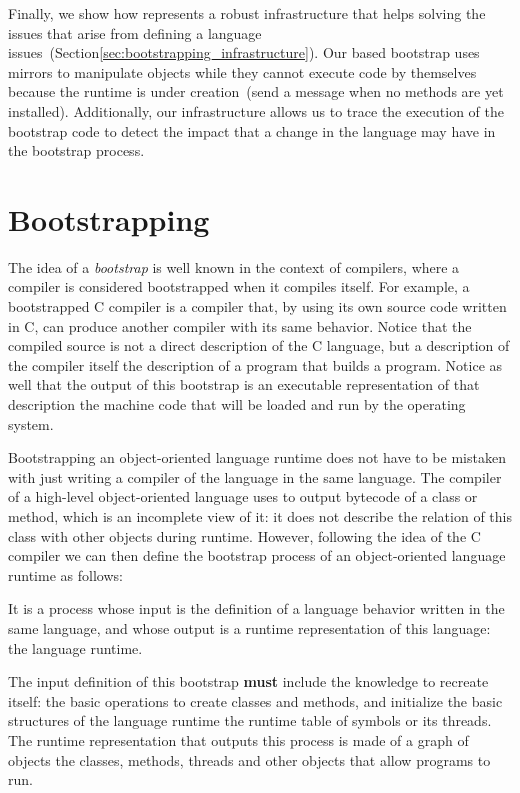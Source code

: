 Finally, we show how \Vtt represents a robust infrastructure that helps solving the issues that arise from defining a language issues~(Section\ref{sec:bootstrapping_infrastructure}). Our \Vtt based bootstrap uses mirrors to manipulate objects while they cannot execute code by themselves because the runtime is under creation~(\eg send a message when no methods are yet installed). Additionally, our infrastructure allows us to trace the execution of the bootstrap code to detect the impact that a change in the language may have in the bootstrap process.


\section{Bootstrapping}\label{sec:bootstrapping}

The idea of a \emph{bootstrap} is well known in the context of compilers, where a compiler is considered bootstrapped when it compiles itself. For example, a bootstrapped C compiler is a compiler that, by using its own source code written in C, can produce another compiler with its same behavior. Notice that the compiled source is not a direct description of the C language, but a description of the compiler itself \ie the description of a program that builds a program. Notice as well that the output of this bootstrap is an executable representation of that description \ie the machine code that will be loaded and run by the operating system.

Bootstrapping an object-oriented language runtime does not have to be mistaken with just writing a compiler of the language in the same language. The compiler of a high-level object-oriented language uses to output  bytecode of a class or method, which is an incomplete view of it: it does not describe the relation of this class with other objects during runtime. However, following the idea of the C compiler we can then define the bootstrap process of an object-oriented language runtime as follows:

\begin{definition}
It is a process whose input is the definition of a language behavior written in the same language, and whose output is a runtime representation of this language: the language runtime. 
\end{definition}

The input definition of this bootstrap \textbf{must} include the knowledge to recreate itself: the basic operations to create classes and methods, and initialize the basic structures of the language runtime \eg the runtime table of symbols or its threads. The runtime representation that outputs this process is made of a graph of objects \ie the classes, methods, threads and other objects that allow programs to run.

